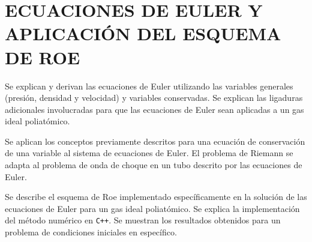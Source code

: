 \chapter{ECUACIONES DE EULER Y APLICACIÓN DEL ESQUEMA DE ROE}

Se explican y derivan las ecuaciones de Euler utilizando las variables generales (presión, densidad y velocidad) y variables conservadas. Se explican las ligaduras adicionales involucradas para que las ecuaciones de Euler sean aplicadas a un gas ideal poliatómico.

Se aplican los conceptos previamente descritos para una ecuación de conservación de una variable al sistema de ecuaciones de Euler. El problema de Riemann se adapta al problema de onda de choque en un tubo descrito por las ecuaciones de Euler.

Se describe el esquema de Roe implementado específicamente en la solución de las ecuaciones de Euler para un gas ideal poliatómico. Se explica la implementación del método numérico en \texttt{C++}. Se muestran los resultados obtenidos para un problema de condiciones iniciales en específico.
